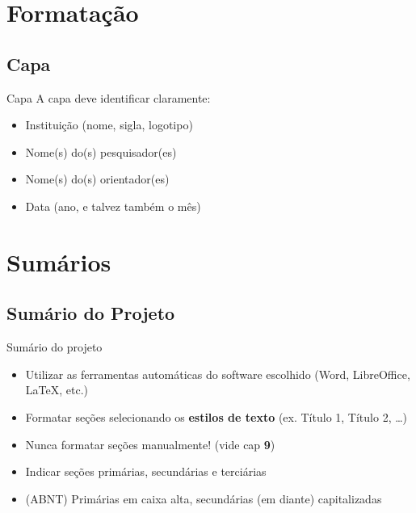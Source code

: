\documentclass{beamer}
\begin{document}
\section{Formatação}

\subsection{Capa}

\begin{frame}{Capa}
A capa deve identificar claramente:
  \begin{itemize}
  \item Instituição (nome, sigla, logotipo)
  \item Nome(s) do(s) pesquisador(es)
  \item Nome(s) do(s) orientador(es)
  \item Data (ano, e talvez também o mês)
  \end{itemize}
\end{frame}

\section{Sumários}

\subsection{Sumário do Projeto}

\begin{frame}{Sumário do projeto}
  \begin{itemize}
  \item Utilizar as ferramentas automáticas do software escolhido
    (Word, LibreOffice, \LaTeX, etc.)
  \item Formatar seções selecionando os {\bf estilos de texto}
    (ex. Título 1, Título 2, \ldots)
  \item \alert{Nunca} formatar seções manualmente! (vide cap {\bf 9})
  \item Indicar seções primárias, secundárias e terciárias
  \item (ABNT) Primárias em caixa alta, secundárias (em diante)
    capitalizadas
  \end{itemize}
\end{frame}
\end{document}
